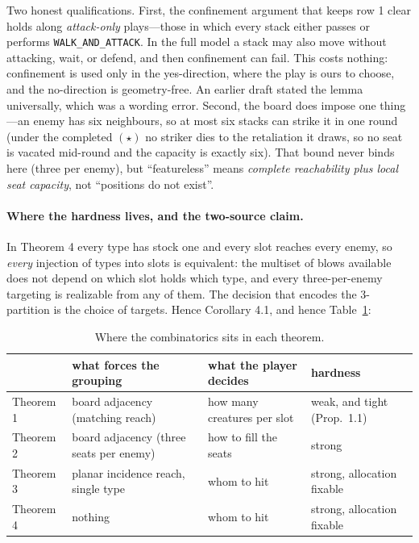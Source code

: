 \documentclass[11pt,a4paper]{article}
\theoremstyle{plain}
\theoremstyle{definition}
\theoremstyle{plain}
\theoremstyle{definition}
\theoremstyle{remark}
\begin{document}
\smallskip
Two honest qualifications. First, the confinement argument that keeps row 1 clear holds along
\emph{attack-only} plays---those in which every stack either passes or performs
\texttt{WALK\_AND\_\allowbreak ATTACK}. In the full model a stack may also move without attacking, wait, or
defend, and then confinement can fail. This costs nothing: confinement is used only in the
yes-direction, where the play is ours to choose, and the no-direction is geometry-free. An
earlier draft stated the lemma universally, which was a wording error. Second, the board does
impose one thing---an enemy has six neighbours, so at most six stacks can strike it in one
round (under the completed $(\star)$ no striker dies to the retaliation it draws, so no seat
is vacated mid-round and the capacity is exactly six). That bound never binds here (three per
enemy), but ``featureless'' means \emph{complete reachability plus local seat capacity}, not
``positions do not exist''.

\paragraph{Where the hardness lives, and the two-source claim.} In Theorem 4 every type has
stock one and every slot reaches every enemy, so \emph{every} injection of types into slots is
equivalent: the multiset of blows available does not depend on which slot holds which type, and
every three-per-enemy targeting is realizable from any of them. The decision that encodes the
3-partition is the choice of targets. Hence Corollary 4.1, and hence
Table~\ref{tab:where}:

\begin{table}[ht]
\centering
\begin{tabular}{@{}p{2.1cm}p{4.3cm}p{3.6cm}p{3.7cm}@{}}
\toprule
 & what forces the grouping & what the player decides & hardness \\
\midrule
Theorem 1 & board adjacency (matching reach) & how many creatures per slot & weak, and tight (Prop.~1.1) \\
Theorem 2 & board adjacency (three seats per enemy) & how to fill the seats & strong \\
Theorem 3 & planar incidence reach, single type & whom to hit & strong, allocation fixable \\
Theorem 4 & nothing & whom to hit & strong, allocation fixable \\
\bottomrule
\end{tabular}
\caption{Where the combinatorics sits in each theorem.}\label{tab:where}
\end{table}
\end{document}
